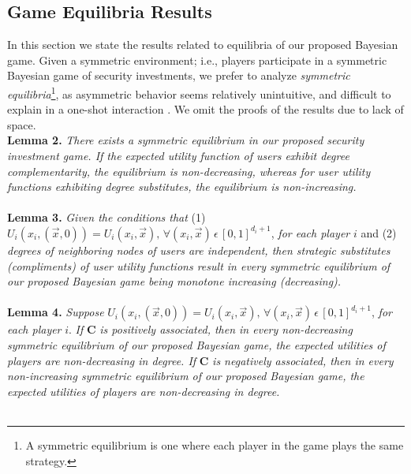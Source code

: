 \documentclass[letterpaper,12pt,onecolumn, nodraft]{IEEEtran}
\begin{document}
\subsection{Game Equilibria Results}
In this section we state the results related to equilibria of our proposed Bayesian game. Given a symmetric environment; i.e., players participate in a symmetric Bayesian game of security investments, we prefer to analyze \emph{symmetric equilibria}\footnote{A symmetric equilibrium is one where each player in the game plays the same strategy.}, as asymmetric behavior seems relatively unintuitive, and difficult to explain in a one-shot interaction \cite{kreps}. We omit the proofs of the results due to lack of space. \\ 
\textbf{Lemma 2.} \emph{There exists a symmetric equilibrium in our proposed security investment game. If the expected utility function of users exhibit degree complementarity, the equilibrium is non-decreasing, whereas for user utility functions exhibiting degree substitutes, the equilibrium is non-increasing.}\\ \\
\textbf{Lemma 3.} \emph{Given the conditions that} (1) $U_{i}(x_{i}, (\overrightarrow x,0)) = U_{i}(x_{i}, \overrightarrow x),\, \forall (x_{i}, \overrightarrow x)\,\epsilon\,[0,1]^{d_{i} + 1}$, \emph{for each player} $i$ and (2) \emph{degrees of neighboring nodes of users are independent, then strategic substitutes (compliments) of user utility functions result in every symmetric equilibrium of our proposed Bayesian game being monotone increasing (decreasing).}  \\ \\
\textbf{Lemma 4.}  \emph{Suppose} $U_{i}(x_{i}, (\overrightarrow x,0)) = U_{i}(x_{i}, \overrightarrow x),\, \forall (x_{i}, \overrightarrow x)\,\epsilon\,[0,1]^{d_{i} + 1}$, \emph{for each player} $i$. \emph{If} \textbf{C} \emph{is positively associated, then in every non-decreasing symmetric equilibrium of our proposed Bayesian game, the expected utilities of players are non-decreasing in degree. If} \textbf{C} \emph{is negatively associated, then in every non-increasing symmetric equilibrium of our proposed Bayesian game, the expected utilities of players are non-decreasing in degree.} \\ \\
\end{document}

